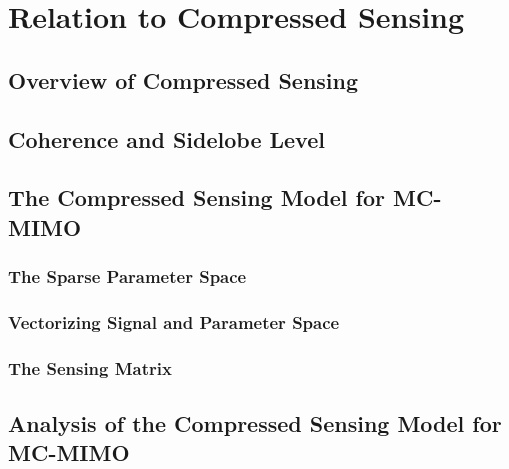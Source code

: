 \documentclass{12pt, a4paper}{scrrprt}
\begin{document}
  \chapter{Relation to Compressed Sensing}
  \label{chap:Relation to Compressed Sensing}

  \section{Overview of Compressed Sensing}
  \label{sec:Overview of Compressed Sensing}

  \section{Coherence and Sidelobe Level}
  \label{sec:Coherence and Sidelobe Level}

  \section{The Compressed Sensing Model for MC-MIMO}
  \label{sec:The Compressed Sensing Model for MC-MIMO}

  \subsection{The Sparse Parameter Space}
  \label{sub:The Sparse Parameter Space}

  \subsection{Vectorizing Signal and Parameter Space}
  \label{sub:Vectorizing Signal and Parameter Space}

  \subsection{The Sensing Matrix}
  \label{sub:The Sensing Matrix}

  \section{Analysis of the Compressed Sensing Model for MC-MIMO}
  \label{sec:Analysis of the Compressed Sensing Model for MC-MIMO}
\end{document}
